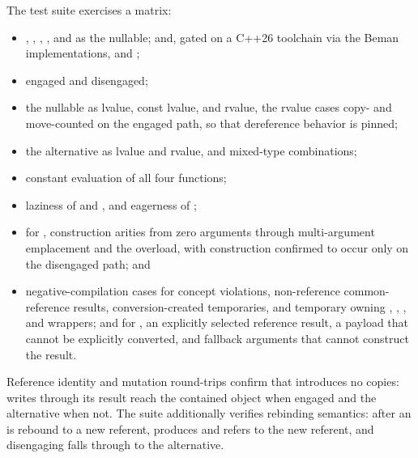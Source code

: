 \documentclass[a4paper,10pt,oneside,openany,final,article]{memoir}
\begin{document}
The test suite exercises a matrix:

\begin{itemize}
\item {}, , ,
  , and  as the
  nullable; and, gated on a C++26 toolchain via the Beman implementations,
   and
  ;
\item engaged and disengaged;
\item the nullable as lvalue, const lvalue, and rvalue, the rvalue cases
  copy- and move-counted on the engaged path, so that dereference behavior is
  pinned;
\item the alternative as lvalue and rvalue, and mixed-type combinations;
\item constant evaluation of all four functions;
\item laziness of  and , and
  eagerness of ;
\item for , construction arities from zero arguments
  through multi-argument emplacement and the 
  overload, with construction confirmed to occur only on the disengaged
  path; and
\item negative-compilation cases for concept violations, non-reference
  common-reference results, conversion-created temporaries, and temporary
  owning , , , and
   wrappers; and for , an explicitly
  selected reference result, a payload that cannot be explicitly converted,
  and fallback arguments that cannot construct the result.
\end{itemize}

Reference identity and mutation
round-trips confirm that  introduces no copies:
writes through its result reach the contained object when engaged and the
alternative when not. The  suite additionally verifies
rebinding semantics: after an  is rebound to a new
referent,  produces and  refers to the
new referent, and disengaging falls through to the alternative.
\end{document}
